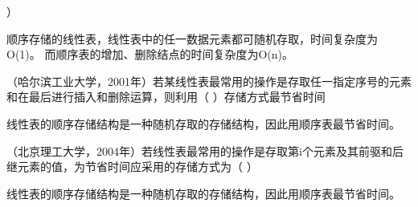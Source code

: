 ）
\par{}
\begin{solution}顺序存储的线性表，线性表中的任一数据元素都可随机存取，时间复杂度为O(1)。
而顺序表的增加、删除结点的时间复杂度为O(n)。
\end{solution}
\question （哈尔滨工业大学，2001年）若某线性表最常用的操作是存取任一指定序号的元素和在最后进行插入和删除运算，则利用（
）存储方式最节省时间
\par{}
\begin{solution}线性表的顺序存储结构是一种随机存取的存储结构，因此用顺序表最节省时间。
\end{solution}
\question （北京理工大学，2004年）若线性表最常用的操作是存取第i个元素及其前驱和后继元素的值，为节省时间应采用的存储方式为（
）
\par{}
\begin{solution}线性表的顺序存储结构是一种随机存取的存储结构，因此用顺序表最节省时间。
\end{solution}
